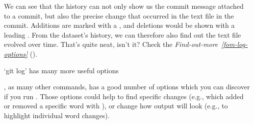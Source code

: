 \sphinxAtStartPar
We can see that the history can not only show us the commit message attached to
a commit, but also the precise change that occurred in the text file in the commit.
Additions are marked with a \sphinxcode{\sphinxupquote{+}}, and deletions would be shown with a leading \sphinxcode{\sphinxupquote{\sphinxhyphen{}}}.
From the dataset’s history, we can therefore also find out  the text file
evolved over time. That’s quite neat, isn’t it?
Check the \textit{Find-out-more}~{\findoutmoreiconinline}\textit{\ref{fom-log-options}} {\hyperref[\detokenize{basics/101-103-modify:fom-log-options}]{}} ().

\ignorespaces \begin{findoutmore}[label={fom-log-options}, before title={\thetcbcounter\ }, float, floatplacement=tb, check odd page=true]{‘git log’ has many more useful options}
\label{\detokenize{basics/101-103-modify:fom-log-options}}

\sphinxAtStartPar
{}, as many other  commands, has a good number of options
which you can discover if you run .  Those options could
help to find specific changes (e.g., which added or removed a specific word
with ), or change how  output will look (e.g.,
 to highlight individual word changes).


\end{findoutmore}

\sphinxstepscope

\ignorespaces 

